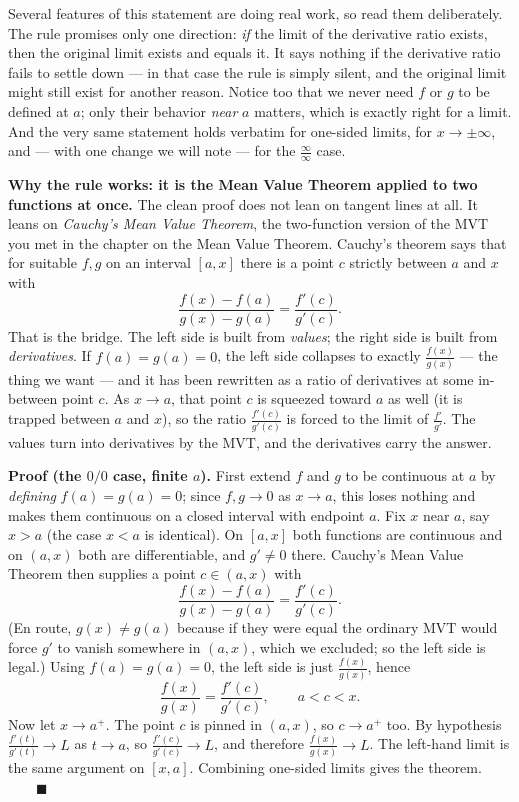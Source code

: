 Several features of this statement are doing real work, so read them deliberately.
The rule promises only one direction: \emph{if} the limit of the derivative ratio
exists, then the original limit exists and equals it. It says nothing if the
derivative ratio fails to settle down --- in that case the rule is simply silent, and
the original limit might still exist for another reason. Notice too that we never need
$f$ or $g$ to be defined at $a$; only their behavior \emph{near} $a$ matters, which is
exactly right for a limit. And the very same statement holds verbatim for one-sided
limits, for $x\to\pm\infty$, and --- with one change we will note --- for the
$\tfrac{\infty}{\infty}$ case.

\begin{whybox}
\textbf{Why the rule works: it is the Mean Value Theorem applied to two functions at
once.} The clean proof does not lean on tangent lines at all. It leans on
\emph{Cauchy's Mean Value Theorem}, the two-function version of the MVT you met in the
chapter on the Mean Value Theorem. Cauchy's theorem says that for suitable $f,g$ on an
interval $[a,x]$ there is a point $c$ strictly between $a$ and $x$ with
\[
\frac{f(x)-f(a)}{g(x)-g(a)}=\frac{f'(c)}{g'(c)}.
\]
That is the bridge. The left side is built from \emph{values}; the right side is built
from \emph{derivatives}. If $f(a)=g(a)=0$, the left side collapses to exactly
$\tfrac{f(x)}{g(x)}$ --- the thing we want --- and it has been rewritten as a ratio of
derivatives at some in-between point $c$. As $x\to a$, that point $c$ is squeezed
toward $a$ as well (it is trapped between $a$ and $x$), so the ratio
$\tfrac{f'(c)}{g'(c)}$ is forced to the limit of $\tfrac{f'}{g'}$. The values turn into
derivatives by the MVT, and the derivatives carry the answer.
\end{whybox}

\begin{focusbox}
\textbf{Proof (the $0/0$ case, finite $a$).}
First extend $f$ and $g$ to be continuous at $a$ by \emph{defining} $f(a)=g(a)=0$;
since $f,g\to 0$ as $x\to a$, this loses nothing and makes them continuous on a closed
interval with endpoint $a$. Fix $x$ near $a$, say $x>a$ (the case $x<a$ is identical).
On $[a,x]$ both functions are continuous and on $(a,x)$ both are differentiable, and
$g'\neq 0$ there. Cauchy's Mean Value Theorem then supplies a point $c\in(a,x)$ with
\[
\frac{f(x)-f(a)}{g(x)-g(a)}=\frac{f'(c)}{g'(c)}.
\]
(En route, $g(x)\neq g(a)$ because if they were equal the ordinary MVT would force
$g'$ to vanish somewhere in $(a,x)$, which we excluded; so the left side is legal.)
Using $f(a)=g(a)=0$, the left side is just $\tfrac{f(x)}{g(x)}$, hence
\[
\frac{f(x)}{g(x)}=\frac{f'(c)}{g'(c)},\qquad a<c<x.
\]
Now let $x\to a^+$. The point $c$ is pinned in $(a,x)$, so $c\to a^+$ too. By
hypothesis $\tfrac{f'(t)}{g'(t)}\to L$ as $t\to a$, so $\tfrac{f'(c)}{g'(c)}\to L$, and
therefore $\tfrac{f(x)}{g(x)}\to L$. The left-hand limit is the same argument on
$[x,a]$. Combining one-sided limits gives the theorem. $\qquad\blacksquare$
\end{focusbox}

